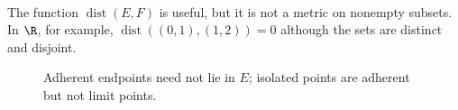 \begin{remark} \label{rem:set-distance-is-not-subset-metric} \\
The function $\operatorname{dist}(E,F)$ is useful, but it is not a metric on nonempty subsets.\\
In $\R$, for example, $\operatorname{dist}((0,1),(1,2))=0$ although the sets are distinct and disjoint.
\end{remark}

\begin{figure}[H]
  \centering
  
  \caption{Adherent endpoints need not lie in $E$; isolated points are adherent but not limit points.}
  \label{fig:adherent-limit-isolated-points}
\end{figure}
